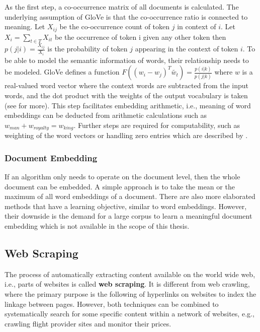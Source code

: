 As the first step, a co-occurrence matrix of all documents is calculated. The underlying assumption of GloVe is that the co-occurrence ratio is connected to meaning.
Let $X_{ij}$ be the co-occurrence count of token $j$ in context of $i$. Let $X_i = \sum_{t \in T} X_{it}$ be the occurrence of token i given any other token then $p(j|i) = \frac{X_{ij}}{X_i}$ is the probability of token $j$ appearing in the context of token $i$.
To be able to model the semantic information of words, their relationship needs to be modeled. GloVe defines a function $F((w_i-w_j)^T \widetilde{w_t}) = \frac{p(i|k)}{p(j|k)}$ where $w$ is a real-valued word vector where the context words are subtracted from the input words, and the dot product with the weights of the output vocabulary is taken (see \cite{Pennington2014} for more). This step facilitates embedding arithmetic, i.e., meaning of word embeddings can be deducted from arithmetic calculations such as $w_{man} + w_{royalty} = w_{king}$. Further steps are required for computability, such as weighting of the word vectors or handling zero entries which are described by \cite{Pennington2014}.


\subsubsection{Document Embedding}
If an algorithm only needs to operate on the document level, then the whole document can be embedded. A simple approach is to take the mean or the maximum of all word embeddings of a document. There are also more elaborated methods \citep{Wu2018, Liu2018, Andrew2015} that have a learning objective, similar to word embeddings. However, their downside is the demand for a large corpus to learn a meaningful document embedding which is not available in the scope of this thesis.

\subsection{Web Scraping}
The process of automatically extracting content available on the world wide web, i.e., parts of websites is called \textbf{web scraping}. It is different from web crawling, where the primary purpose is the following of hyperlinks on websites to index the linkage between pages. However, both techniques can be combined to systematically search for some specific content within a network of websites, e.g., crawling flight provider sites and monitor their prices.

